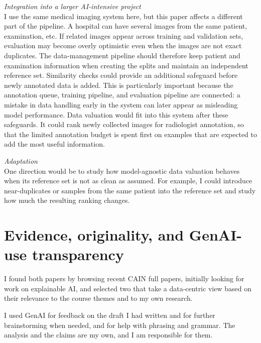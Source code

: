 \documentclass[11pt,a4paper]{article}
\newcommand{\heading}[1]{
  \vspace{.5em}
  \noindent\emph{#1}
}
\begin{document}
\heading{Integration into a larger AI-intensive project}\\
I use the same medical imaging system here, but this paper affects a different part of the pipeline. A hospital can have several images from the same patient, examination, etc. If related images appear across training and validation sets, evaluation may become overly optimistic even when the images are not exact duplicates.
The data-management pipeline should therefore keep patient and examination information when creating the splits and maintain an independent reference set. Similarity checks could provide an additional safeguard before newly annotated data is added. This is particularly important because the annotation queue, training pipeline, and evaluation pipeline are connected: a mistake in data handling early in the system can later appear as misleading model performance. Data valuation would fit into this system after these safeguards. It could rank newly collected images for radiologist annotation, so that the limited annotation budget is spent first on examples that are expected to add the most useful information.


\heading{Adaptation}\\
One direction would be to study how model-agnostic data valuation behaves when its reference set is not as clean as assumed. For example, I could introduce near-duplicates or samples from the same patient into the reference set and study how much the resulting ranking changes.


\section{Evidence, originality, and GenAI-use transparency}

I found both papers by browsing recent CAIN full papers, initially looking for work on explainable AI, and selected two that take a data-centric view based on their relevance to the course themes and to my own research. 

I used GenAI for feedback on the draft I had written and for further brainstorming when needed, and for help with phrasing and grammar. The analysis and the claims are my own, and I am responsible for them.



\end{document}
